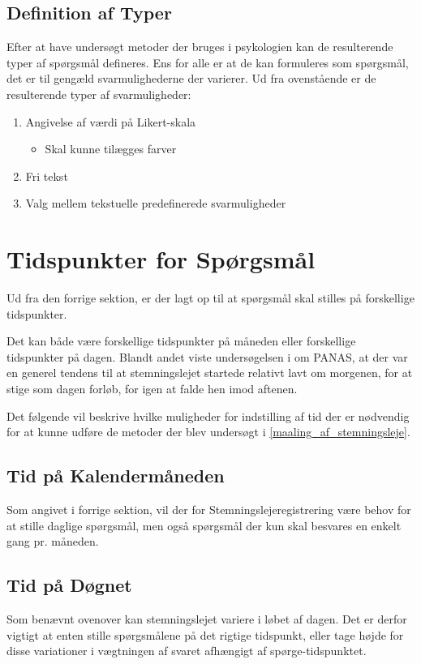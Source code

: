 \subsection{Definition af Typer}
Efter at have undersøgt metoder der bruges i psykologien kan de resulterende typer af spørgsmål defineres.
Ens for alle er at de kan formuleres som spørgsmål, det er til gengæld svarmulighederne der varierer.
Ud fra ovenstående er de resulterende typer af svarmuligheder:

\begin{enumerate}
\item Angivelse af værdi på Likert-skala
\begin{itemize}
\item Skal kunne tilægges farver
\end{itemize}
\item Fri tekst
\item Valg mellem tekstuelle predefinerede svarmuligheder
\end{enumerate}

\section{Tidspunkter for Spørgsmål}
Ud fra den forrige sektion, er der lagt op til at spørgsmål skal stilles på forskellige tidspunkter.

Det kan både være forskellige tidspunkter på måneden eller forskellige tidspunkter på dagen.
Blandt andet viste undersøgelsen i \citet{panas} om PANAS, at der var en generel tendens til at stemningslejet startede relativt lavt om morgenen, for at stige som dagen forløb, for igen at falde hen imod aftenen.

Det følgende vil beskrive hvilke muligheder for indstilling af tid der er nødvendig for at kunne udføre de metoder der blev undersøgt i \cref{maaling_af_stemningsleje}.

\subsection{Tid på Kalendermåneden}
Som angivet i forrige sektion, vil der for Stemningslejeregistrering være behov for at stille daglige spørgsmål, men også spørgsmål der kun skal besvares en enkelt gang pr. måneden.

\subsection{Tid på Døgnet}
Som benævnt ovenover kan stemningslejet variere i løbet af dagen.
Det er derfor vigtigt at enten stille spørgsmålene på det rigtige tidspunkt, eller tage højde for disse variationer i vægtningen af svaret afhængigt af spørge-tidspunktet.

